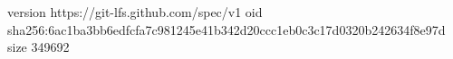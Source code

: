version https://git-lfs.github.com/spec/v1
oid sha256:6ac1ba3bb6edfcfa7c981245e41b342d20ccc1eb0c3c17d0320b242634f8e97d
size 349692
